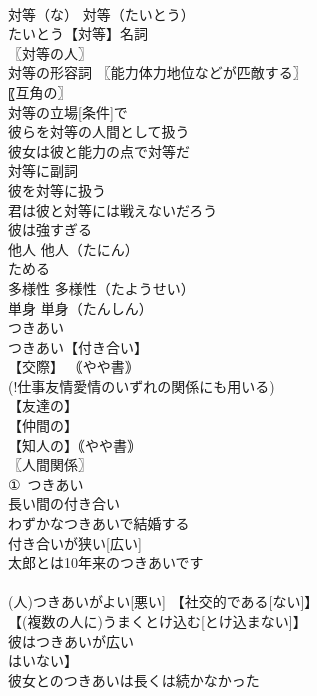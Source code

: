 \documentclass[8pt]{extreport}
\begin{document}
\begin{CJK}{UTF8}{min}
\\	対等（な）		対等（たいとう） 
\\	たいとう【対等】名詞 
\\	〖対等の人〗
\\	対等の形容詞 〖能力体力地位などが匹敵する〗
\\	〖互角の〗
\\	対等の立場[条件]で 
\\	彼らを対等の人間として扱う 
\\	彼女は彼と能力の点で対等だ 
\\	対等に副詞 
\\	彼を対等に扱う 
\\	君は彼と対等には戦えないだろう
\\	彼は強すぎる 
\\	他人		他人（たにん） 
\\	ためる		
\\	多様性		多様性（たようせい） 
\\	単身		単身（たんしん） 
\\	つきあい		
\\	つきあい【付き合い】 
\\	【交際】 ｟やや書｠
\\	(!仕事友情愛情のいずれの関係にも用いる) 
\\	【友達の】
\\	【仲間の】
\\	【知人の】｟やや書｠
\\	〖人間関係〗
\\	①~つきあい 
\\	長い間の付き合い 
\\	わずかなつきあいで結婚する 
\\	付き合いが狭い[広い] 
\\	太郎とは10年来のつきあいです 
\\	[｟やや書｠ 
\\	と複数形に注意) 
\\	我々は会ったら話をする程度のつきあいです 
\\	(!後の方が口語的) ②つきあいが[は] 
\\	(人)つきあいがよい[悪い] 【社交的である[ない]】
\\	【(複数の人に)うまくとけ込む[とけ込まない]】
\\	彼はつきあいが広い 
\\	[(多くの知人がある) 
\\	当方は暴力団とのつきあいはない 
\\	【暴力団員に知人[友人]はいない】
\\	彼女とのつきあいは長くは続かなかった 

\end{CJK}
\end{document}
